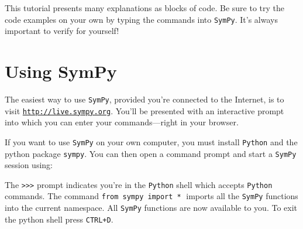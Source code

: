 

This tutorial presents many explanations as blocks of code. 
Be sure to try the code examples on your own by typing the commands into \texttt{SymPy}.
It's always important to verify for yourself!



\section*{Using SymPy}

The easiest way to use \texttt{SymPy},
provided you're connected to the Internet,
is to visit \href{http://live.sympy.org}{\texttt{http://live.sympy.org}}.
You'll be presented with an interactive prompt into which
you can enter your commands---right in your browser. 

If you want to use \texttt{SymPy} on your own computer,
you must install \texttt{Python} and the python package \texttt{sympy}.
You can then open a command prompt and start a \texttt{SymPy} session using:



\small
{}
\normalsize

\noindent
The \texttt{>{}>{}>} prompt indicates you're in the \texttt{Python} shell which accepts \texttt{Python} commands.
The command \texttt{from sympy import *}$\;$ imports all the \texttt{SymPy} functions into the current namespace. 
All \texttt{SymPy} functions are now available to you.
%
To exit the python shell press \texttt{CTRL+D}. 
%

